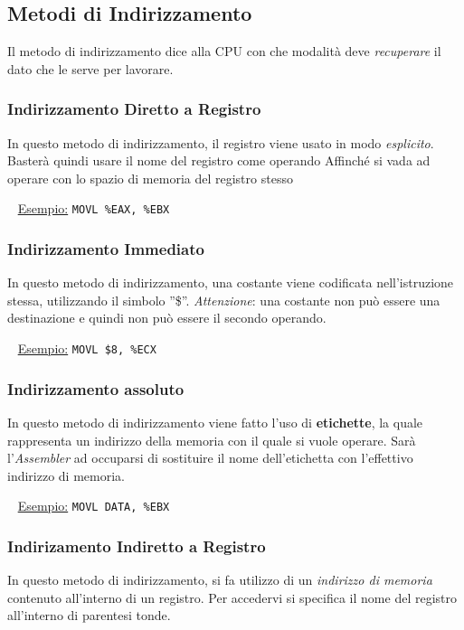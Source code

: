 \documentclass[a4paper,11pt,oneside]{book}
\begin{document}
\subsection{Metodi di Indirizzamento}
Il metodo di indirizzamento dice alla CPU con che modalità deve \emph{recuperare} il dato che le serve per lavorare.

\subsubsection{Indirizzamento Diretto a Registro}
In questo metodo di indirizzamento, il registro viene usato in modo \emph{esplicito}. Basterà quindi usare il nome del registro come operando Affinché
si vada ad operare con lo spazio di memoria del registro stesso

~\newline
\underline{Esempio:} \tabto{3cm} \texttt{MOVL \%EAX, \%EBX}


\subsubsection{Indirizzamento Immediato}
In questo metodo di indirizzamento, una costante viene codificata nell'istruzione stessa, utilizzando il simbolo ''\$''.
\newline \emph{Attenzione}: una costante non può essere una destinazione e quindi non può essere il secondo operando.

~\newline
\underline{Esempio:} \tabto{3cm} \texttt{MOVL \$8, \%ECX}


\subsubsection{Indirizzamento assoluto}
In questo metodo di indirizzamento viene fatto l'uso di \textbf{etichette}, la quale rappresenta un indirizzo della memoria con il quale si vuole operare.
\newline Sarà l'\emph{Assembler} ad occuparsi di sostituire il nome dell'etichetta con l'effettivo indirizzo di memoria.

~\newline
\underline{Esempio:} \tabto{3cm} \texttt{MOVL DATA, \%EBX}


\subsubsection{Indirizamento Indiretto a Registro}
In questo metodo di indirizzamento, si fa utilizzo di un \emph{indirizzo di memoria} contenuto all'interno di un registro. Per accedervi si specifica
il nome del registro all'interno di parentesi tonde.
\end{document}
